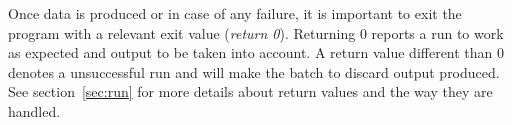 Once data is produced or in case of any failure, it is important to exit the program with a relevant exit value (\emph{return 0}). Returning 0 reports a run to work as expected and output to be taken into account. A return value different than 0 denotes a unsuccessful run and will make the batch to discard output produced. See section~\ref{sec:run} for more details about return values and the way they are handled.


